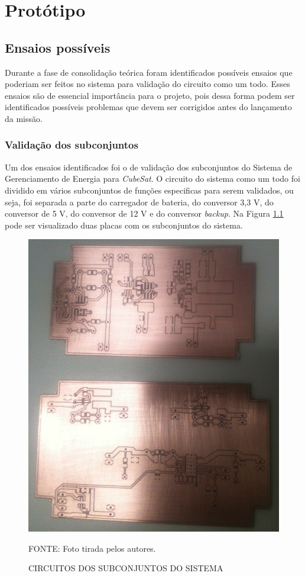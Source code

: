 \documentclass[
	12pt,				%
	openright,			%
	oneside,			%
	a4paper,			%
	english,			%
	french,				%
	spanish,			%
	brazil,				%
	oldfontcommands
	]{abntex2}
\begin{document}
\chapter[Protótipo]{Protótipo}

\section[Ensaios possíveis]{Ensaios possíveis}
	
	Durante a fase de consolidação teórica foram identificados possíveis ensaios que poderiam ser feitos no sistema para validação do circuito como um todo. Esses ensaios são de essencial importância para o projeto, pois dessa forma podem ser identificados possíveis problemas que devem ser corrigidos antes do lançamento da missão.
	
\subsection[Validação dos subconjuntos]{Validação dos subconjuntos}

	Um dos ensaios identificados foi o de validação dos subconjuntos do Sistema de Gerenciamento de Energia para \textit{CubeSat}. O circuito do sistema como um todo foi dividido em vários subconjuntos de funções especificas para serem validados, ou seja, foi separada a parte do carregador de bateria, do conversor 3,3 V, do conversor de 5 V, do conversor de 12 V e do conversor \textit{backup}. Na Figura \ref{Fig_SubConj} pode ser visualizado duas placas com os subconjuntos do sistema.
	
	\begin{figure}[th]
		\caption{CIRCUITOS DOS SUBCONJUNTOS DO SISTEMA}
		\label{Fig_SubConj}
		\centering
		\includegraphics[width=0.7\linewidth]{./figs/placas_subconjuntos}
			
		\begin{small}
			FONTE: Foto tirada pelos autores.
		\end{small}		
	\end{figure}
	
\end{document}

